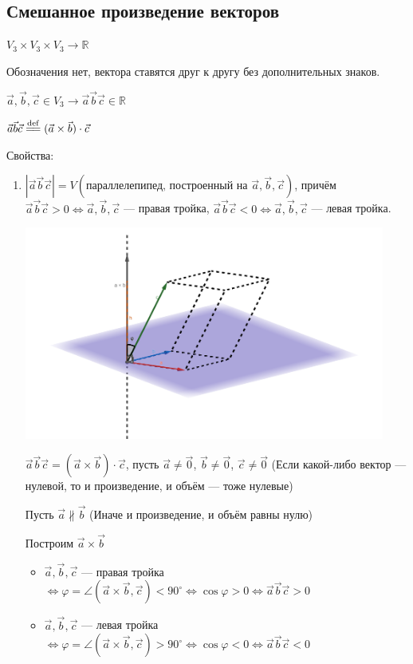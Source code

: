 \documentclass[twoside]{book}
\newcommand{\defeq}{\overset{\mathrm{def}}{=\joinrel=}}
\begin{document}
\subsection{Смешанное произведение векторов}
\(V_3 \times V_3 \times V_3 \rightarrow \mathbb{R}\)

Обозначения нет, вектора ставятся друг к другу без дополнительных знаков.

\(\vec a, \vec b, \vec c \in V_3 \rightarrow \vec a \vec b \vec c \in \mathbb{R}\)

\(\vec a \vec b \vec c \defeq (\vec a \times \vec b) \cdot \vec c\)

Свойства:
\begin{enumerate}
    \item \(|\vec a \vec b \vec c| = V(\text{параллелепипед, построенный на } \vec a, \vec b, \vec c)\),
          причём \(\vec a \vec b \vec c > 0 \Leftrightarrow \vec a, \vec b, \vec c\) --- правая тройка,
          \(\vec a \vec b \vec c < 0 \Leftrightarrow \vec a, \vec b, \vec c\) --- левая тройка.

          \begin{center}
              \includegraphics[height=7cm]{Images/Chapter_1/1-6-1.png}
          \end{center}

          \(\vec a \vec b \vec c = (\vec a \times \vec b) \cdot \vec c\),
          пусть \(\vec a \neq \vec 0\), \(\vec b \neq \vec 0\), \(\vec c \neq \vec 0\) (Если какой-либо вектор --- нулевой, то и произведение, и объём --- тоже нулевые)

          Пусть \(\vec a \nparallel \vec b\) (Иначе и произведение, и объём равны нулю)

          Построим \(\vec a \times \vec b\)
          \begin{itemize}
              \item \(\vec a, \vec b, \vec c\) --- правая тройка \(\Leftrightarrow \varphi = \angle(\vec a \times \vec b, \vec c) < 90^{\circ} \Leftrightarrow \cos\varphi > 0 \Leftrightarrow \vec a \vec b \vec c > 0\)
              \item \(\vec a, \vec b, \vec c\) --- левая тройка \(\Leftrightarrow \varphi = \angle(\vec a \times \vec b, \vec c) > 90^{\circ} \Leftrightarrow \cos\varphi < 0 \Leftrightarrow \vec a \vec b \vec c < 0\)
          \end{itemize}


\end{enumerate}
\end{document}
